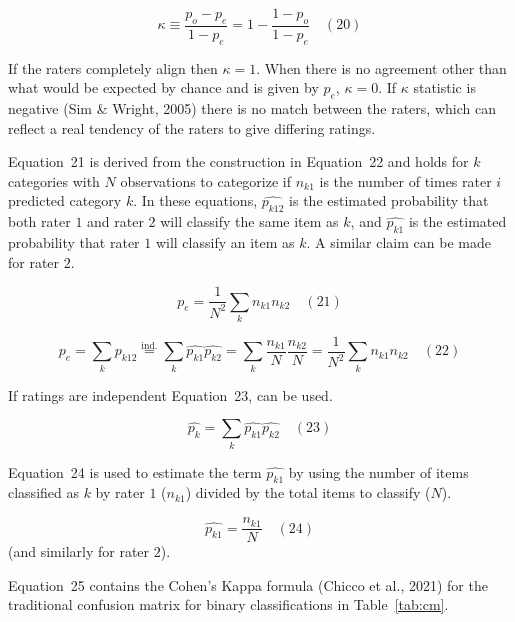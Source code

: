 \documentclass[sn-mathphys-num]{sn-jnl}%
\begin{document}
\begin{equation}
	\kappa \equiv {\frac {p_{o}-p_{e}}{1-p_{e}}}=1-{\frac {1-p_{o}}{1-p_{e}}}
	\quad\left(20\right)
\end{equation}

If the raters completely align then $\kappa = 1$. When there is no agreement other than what would be expected by chance and is given by $p_{e}$, $\kappa = 0$. If $\kappa$ statistic is negative (Sim & Wright, 2005) there is no match between the raters, which can reflect a real tendency of the raters to give differing ratings.

Equation~21 is derived from the construction in Equation~22 and holds for $k$ categories with $N$ observations to categorize if $n_{k1}$ is the number of times rater $i$ predicted category $k$. In these equations, ${\widehat{p_{k12}}}$ is the estimated probability that both rater $1$ and rater $2$ will classify the same item as $k$, and ${\widehat {p_{k1}}}$ is the estimated probability that rater $1$ will classify an item as $k$. A similar claim can be made for rater $2$.

\begin{equation}
	p_{e}={\frac {1}{N^{2}}}\sum_{k}n_{k1}n_{k2}
	\quad\left(21\right)
\end{equation}

\begin{equation}
	p_{e}=\sum_{k}{\widehat {p_{k12}}}{\overset{\text{ind.}}{=}}\sum_{k}{\widehat {p_{k1}}}{\widehat {p_{k2}}}=\sum_{k}{\frac {n_{k1}}{N}}{\frac {n_{k2}}{N}}={\frac {1}{N^{2}}}\sum_{k}n_{k1}n_{k2}
	\quad\left(22\right)
\end{equation}

If ratings are independent Equation~23, can be used.

\begin{equation}
	\textstyle{\widehat{p_{k}}}=\sum_{k}{\widehat{p_{k1}}}{\widehat {p_{k2}}}
	\quad\left(23\right)
\end{equation}

Equation~24 is used to estimate the term $\widehat{p_{k1}}$ by using the number of items classified as $k$ by rater $1$ ($n_{k1}$) divided by the total items to classify ($N$).

\begin{equation}
	\widehat {p_{k1}}=\frac{n_{k1}}{N}
	\quad\left(24\right)
\end{equation}
 (and similarly for rater $2$).
 
Equation~25 contains the Cohen's Kappa formula (Chicco et al., 2021) for the traditional confusion matrix for binary classifications in Table~\ref{tab:cm}.
\end{document}
